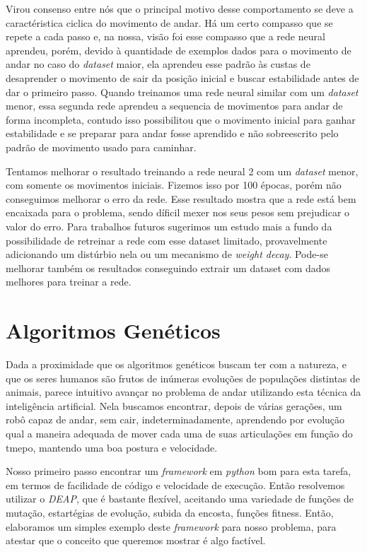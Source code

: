 \documentclass[twoside,conference,a4paper]{IEEEtran}
\begin{document}
Virou consenso entre nós que o principal motivo desse comportamento se deve a caractéristica ciclica do movimento de andar. Há um certo compasso que se repete a cada passo e, na nossa, visão foi esse compasso que a rede neural aprendeu, porém, devido à quantidade de exemplos dados para o movimento de andar no caso do \textsl{dataset} maior, ela aprendeu esse padrão às custas de desaprender o movimento de sair da posição inicial e buscar estabilidade antes de dar o primeiro passo. Quando treinamos uma rede neural similar com um \textsl{dataset} menor, essa segunda rede aprendeu a sequencia de movimentos para andar de forma incompleta, contudo isso possibilitou que o movimento inicial para ganhar estabilidade e se preparar para andar fosse aprendido e não sobreescrito pelo padrão de movimento usado para caminhar.

Tentamos melhorar o resultado treinando a rede neural 2 com um \textsl{dataset} menor, com somente os movimentos iniciais. Fizemos isso por 100 épocas, porém não conseguimos melhorar o erro da rede. Esse resultado mostra que a rede está bem encaixada para o problema, sendo díficil mexer nos seus pesos sem prejudicar o valor do erro. Para trabalhos futuros sugerimos um estudo mais a fundo da possibilidade de retreinar a rede com esse dataset limitado, provavelmente adicionando um distúrbio nela ou um mecanismo de \textsl{weight decay}\cite{hastie01statisticallearning}. Pode-se melhorar também os resultados conseguindo extrair um dataset com dados melhores para treinar a rede.


\section{Algoritmos Genéticos} \label{algoritmos_geneticos}

Dada a proximidade que os algoritmos genéticos buscam ter com a natureza, e que os seres humanos são frutos de inúmeras evoluções de populações distintas de animais, parece intuitivo avançar no problema de andar utilizando esta técnica da inteligência artificial. Nela buscamos encontrar, depois de várias gerações, um robô capaz de andar, sem cair, indeterminadamente, aprendendo por evolução qual a maneira adequada de mover cada uma de suas articulações em função do tmepo, mantendo uma boa postura e velocidade.

Nosso primeiro passo encontrar um \textsl{framework} em \textsl{python} bom para esta tarefa, em termos de facilidade de código e velocidade de execução. Então resolvemos utilizar o \textsl{DEAP}\cite{deap}, que é bastante flexível, aceitando uma variedade de funções de mutação, estartégias de evolução, subida da encosta, funções fitness. Então, elaboramos um simples exemplo deste \textsl{framework} para nosso problema, para atestar que o conceito que queremos mostrar é algo factível.
\end{document}
